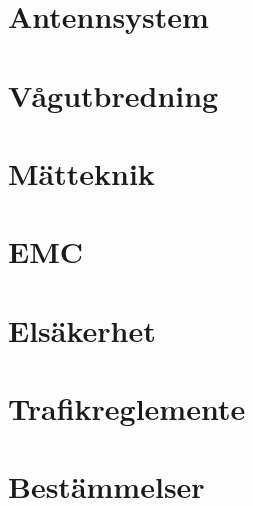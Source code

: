 \chapter{Antennsystem}







\chapter{Vågutbredning}
\label{vågutbredning}








\chapter{Mätteknik}



\chapter{EMC}







\chapter{Elsäkerhet}





%

\chapter{Trafikreglemente}







\chapter{Bestämmelser}




